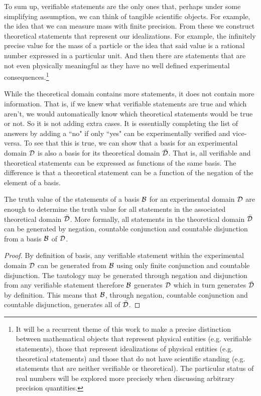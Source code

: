 \documentclass[11pt,letterpaper,fleqn]{memoir} %
\begin{document}
To sum up, verifiable statements are the only ones that, perhaps under some simplifying assumption, we can think of tangible scientific objects. For example, the idea that we can measure mass with finite precision. From these we construct theoretical statements that represent our idealizations. For example, the infinitely precise value for the mass of a particle or the idea that said value is a rational number expressed in a particular unit. And then there are statements that are not even physically meaningful as they have no well defined experimental consequences.\footnote{It will be a recurrent theme of this work to make a precise distinction between mathematical objects that represent physical entities (e.g. verifiable statements), those that represent idealizations of physical entities (e.g. theoretical statements) and those that do not have scientific standing (e.g. statements that are neither verifiable or theoretical). The particular status of real numbers will be explored more precisely when discussing arbitrary precision quantities.}

While the theoretical domain contains more statements, it does not contain more information. That is, if we knew what verifiable statements are true and which aren't, we would automatically know which theoretical statements would be true or not. So it is not adding extra cases. It is essentially completing the list of answers by adding a ``no" if only ``yes" can be experimentally verified and vice-versa. To see that this is true, we can show that a basis for an experimental domain $\mathcal{D}$ is also a basis for its theoretical domain $\bar{\mathcal{D}}$. That is, all verifiable and theoretical statements can be expressed as functions of the same basis. The difference is that a theoretical statement can be a function of the negation of the element of a basis.

\begin{mathSection}
\begin{prop}
	The truth value of the statements of a basis $\mathcal{B}$ for an experimental domain $\mathcal{D}$ are enough to determine the truth value for all statements in the associated theoretical domain $\bar{\mathcal{D}}$. More formally, all statements in the theoretical domain $\bar{\mathcal{D}}$ can be generated by negation, countable conjunction and countable disjunction from a basis $\mathcal{B}$ of $\mathcal{D}$.
\end{prop}

\begin{proof}
	By definition of basis, any verifiable statement within the experimental domain $\mathcal{D}$ can be generated from $\mathcal{B}$ using only finite conjunction and countable disjunction. The tautology may be generated through negation and disjunction from any verifiable statement therefore $\mathcal{B}$ generates $\mathcal{D}$ which in turn generates $\bar{\mathcal{D}}$ by definition. This means that $\mathcal{B}$, through negation, countable conjunction and countable disjunction, generates all of $\bar{\mathcal{D}}$.
\end{proof}
\end{mathSection}
\end{document}

